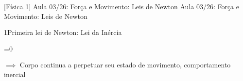 \documentclass[\mainfilename]{subfiles}
\begin{document}

[Física 1]
{Aula 03/26: Força e Movimento: Leis de Newton} %
{Aula 03/26: Força e Movimento: Leis de Newton} %

\begin{sectionBox}1{Primeira lei de Newton: Lei da Inércia} %
    
    \begin{BM}
        =0 \implies
    \end{BM}
    \(\implies\) Corpo continua a perpetuar seu estado de movimento, comportamento inercial
    
\end{sectionBox}
\end{document}
